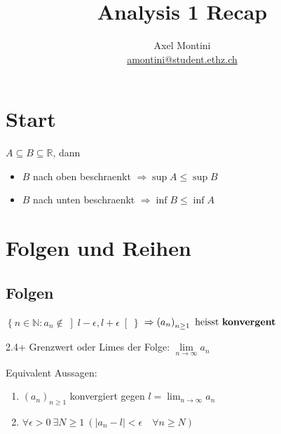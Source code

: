 \documentclass[8pt,a4paper,twocolumn]{extarticle}
\title{Analysis 1 Recap}
\author{Axel Montini \\ \href{mailto:amontini@student.ethz.ch}{amontini@student.ethz.ch}}
\newcommand{\N}{\mathbb{N}}
\newcommand{\R}{\mathbb{R}}
\newcommand{\seq}[1]{\left( #1_n \right)_{n \ge 1}}
\begin{document}
\maketitle

\section{Start}

\begin{korollar}{1.16}
    \label{korollar:inf-sup}
    $A \subseteq B \subseteq \R$, dann
    \begin{itemize}
        \item $B$ nach oben beschraenkt $\Rightarrow \sup A \le \sup B$
        \item $B$ nach unten beschraenkt $\Rightarrow \inf B \le \inf A$
    \end{itemize}
\end{korollar}

\section{Folgen und Reihen}
\subsection{Folgen}
\begin{definition}{2.4}
    $\left\{ n \in \N : a_n \notin \left] l - \epsilon, l + \epsilon \right[ \right\}$
    $\Rightarrow \seq{a}\ \mbox{heisst \textbf{konvergent}}$
\end{definition}

\begin{definition}{2.4+}
    Grenzwert oder Limes der Folge: $\underset{n \to \infty}{\lim} a_n$
\end{definition}

\begin{lemma}
    Equivalent Aussagen:
    \begin{enumerate}
        \item $\seq{a}$ konvergiert gegen $l = \lim_{n \to \infty} a_n$
        \item $\forall \epsilon > 0\ \exists N \ge 1\ \left( \lvert a_n - l \rvert < \epsilon \quad \forall n \ge N \right)$
    \end{enumerate}
\end{lemma}
\end{document}
